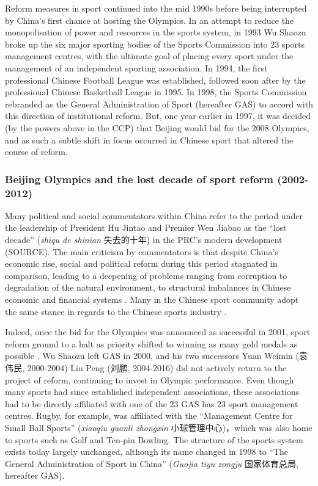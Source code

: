 \begin{CJK}{UTF8}{gbsn}
Reform measures in sport continued into the mid 1990s before being interrupted by China's first chance at hosting the Olympics.  In an attempt to reduce the monopolisation of power and resources in the sports system, in 1993 Wu Shaozu broke up the six major sporting bodies of the Sports Commission into 23 sports management centres, with the ultimate goal of placing every sport under the management of an independent sporting association.  In 1994, the first professional Chinese Football League was established, followed soon after by the professional Chinese Basketball League in 1995.  In 1998, the Sports Commission rebranded as the General Administration of Sport (hereafter GAS) to accord with this direction of institutional reform.  But, one year earlier in 1997, it was decided (by the powers above in the CCP) that Beijing would bid for the 2008 Olympics, and as such a subtle shift in focus occurred in Chinese sport that altered the course of reform.


\subsubsection{Beijing Olympics and the lost decade of sport reform (2002-2012)}

Many political and social commentators within China refer to the period under the leadership of President Hu Jintao and Premier Wen Jiabao as the ``lost decade'' (\textit{shiqu de shinian} 失去的十年) in the PRC's modern development (SOURCE). The main criticism by commentators is that despite China's economic rise, social and political reform during this period stagnated in comparison, leading to a deepening of problems ranging from corruption to degradation of the natural environment, to structural imbalances in Chinese economic and financial systems \citep{Barme2014}.  Many in the Chinese sport community adopt the same stance in regards to the Chinese sports industry \citep{News2017}.

Indeed, once the bid for the Olympics was announced as successful in 2001, sport reform ground to a halt as priority shifted to winning as many gold medals as possible \citep{News2017}.  Wu Shaozu left GAS in 2000, and his two successors Yuan Weimin (袁伟民, 2000-2004) Liu Peng (刘鹏, 2004-2016) did not actively return to the project of reform, continuing to invest in Olympic performance.  Even though many sports had since established independent associations, these associations had to be directly affiliated with one of the 23 GAS has 23 sport management centres. Rugby, for example, was affiliated with the ``Management Centre for Small Ball Sports'' (\textit{xiaoqiu guanli zhongxin} 小球管理中心)，which was also home to sports such as Golf and Ten-pin Bowling.  The structure of the sports system exists today largely unchanged, although its name changed in 1998 to ``The General Administration of Sport in China'' (\textit{Guojia tiyu zongju} 国家体育总局, hereafter GAS).


\end{CJK}
